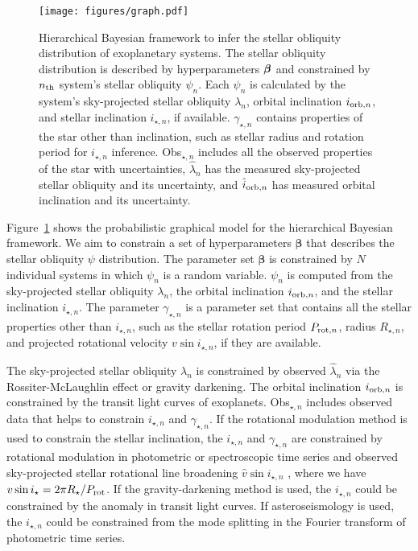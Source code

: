 \documentclass[twocolumn,times]{aastex631}
\begin{document}
\begin{figure}[ht!]
    \texttt{[image: figures/graph.pdf]}
    \caption{Hierarchical Bayesian framework to infer the stellar obliquity distribution of exoplanetary systems. The stellar obliquity distribution is described by hyperparameters $\vb*{\beta}$ and constrained by $n_{\rm th}$ system's stellar obliquity $\psi_n$. Each $\psi_n$ is calculated by the system's sky-projected stellar obliquity $\lambda_n$, orbital inclination $i_{{\rm orb}, n}$, and stellar inclination $i_{\star, n}$, if available. $\gamma_{\star, n}$ contains properties of the star other than inclination, such as stellar radius and rotation period for $i_{\star, n}$ inference. Obs$_{\star,n}$ includes all the observed properties of the star with uncertainties, $\hat{\lambda}_n$ has the measured sky-projected stellar obliquity and its uncertainty, and $\hat{i}_{{\rm orb}, n}$ has measured orbital inclination and its uncertainty.}
    \label{fig:graph}
\end{figure}

Figure~\ref{fig:graph} shows the probabilistic graphical model for the hierarchical Bayesian framework. We aim to constrain a set of hyperparameters $\bm{\beta}$ that describes the stellar obliquity $\psi$ distribution. The parameter set $\bm{\beta}$ is constrained by $N$ individual systems in which $\psi_n$ is a random variable. $\psi_n$ is computed from the sky-projected stellar obliquity $\lambda_n$, the orbital inclination $i_{{\rm orb},n}$, and the stellar inclination $i_{\star, n}$. 
The parameter $\gamma_{\star, n}$ is a parameter set that contains all the stellar properties other than $i_{\star,n}$, such as the stellar rotation period $P_{{\rm rot},n}$, radius $R_{\star,n}$, and projected rotational velocity $v\sin{i_{\star,n}}$, if they are available.

The sky-projected stellar obliquity $\lambda_n$ is constrained by observed $\hat{\lambda}_n$ via the Rossiter-McLaughlin effect or gravity darkening.
The orbital inclination $i_{{\rm orb},n}$ is constrained by the transit light curves of exoplanets.
Obs$_{\star,n}$ includes observed data that helps to constrain $i_{\star,n}$ and $\gamma_{\star, n}$.
If the rotational modulation method is used to constrain the stellar inclination, the $i_{\star,n}$ and $\gamma_{\star,n}$ are constrained by rotational modulation in photometric or spectroscopic time series and observed sky-projected stellar rotational line broadening $\hat{v}\sin{i_{\star,n}}$ \citep[e.g.,][]{Masuda20}, where we have $v\sin{i_\star} = 2 \pi R_\star / P_{\rm rot}$.
If the gravity-darkening method is used, the $i_{\star,n}$ could be constrained by the anomaly in transit light curves. If asteroseismology is used, the $i_{\star,n}$ could be constrained from the mode splitting in the Fourier transform of photometric time series.
\end{document}

